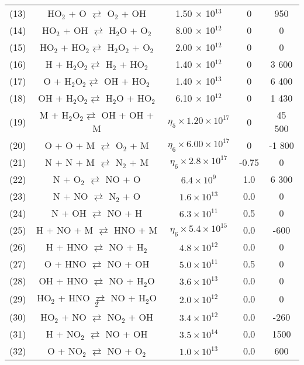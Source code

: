 \documentclass{warpdoc}
\begin{document}
\begin{table}[t]
\begin{center}
\begin{threeparttable}
\begin{tabular}{ccccc}
(13) & HO$_{2}$ + O $\rightleftarrows$ O$_{2}$ + OH & 1.50 $\times$ 10$^{13}$ & 0 &  950 \\
(14) & HO$_{2}$ + OH $\rightleftarrows$ H$_{2}$O + O$_{2}$ & 8.00 $\times$ 10$^{12}$ & 0 & 0 \\
(15) & HO$_{2}$ + HO$_{2} \rightleftarrows$ H$_{2}$O$_{2}$ + O$_{2}$ & 2.00 $\times$ 10$^{12}$ & 0 & 0 \\
(16) & H + H$_{2}$O$_{2} \rightleftarrows$ H$_{2}$ + HO$_{2}$ & 1.40 $\times$ 10$^{12}$ & 0 & 3 600 \\
(17) & O + H$_{2}$O$_{2} \rightleftarrows$ OH + HO$_{2}$ & 1.40 $\times$ 10$^{13}$ & 0 & 6 400 \\
(18) & OH + H$_{2}$O$_{2} \rightleftarrows$ H$_{2}$O + HO$_{2}$ & 6.10 $\times$ 10$^{12}$ & 0 & 1 430 \\
(19) & M + H$_{2}$O$_{2} \rightleftarrows$ OH + OH + M & $\eta_5 \times 1.20 \times 10^{17}$ & 0 & 45 500 \\
(20) & O + O + M $\rightleftarrows$ O$_{2}$ + M & $\eta_6 \times 6.00 \times 10^{17}$ & 0 & -1 800 \\
(21) & N + N + M $\rightleftarrows$ N$_{2}$ + M & $\eta_6 \times 2.8 \times 10^{17}$ & -0.75 & 0 \\
(22) & N + O$_2$  $\rightleftarrows$ NO + O & $6.4 \times 10^{9}$ & 1.0 & 6 300 \\
(23) & N + NO  $\rightleftarrows$ N$_2$ + O & $1.6 \times 10^{13}$ & 0.0 & 0 \\
(24) & N + OH  $\rightleftarrows$ NO + H & $6.3 \times 10^{11}$ & 0.5 & 0 \\
(25) & H + NO + M  $\rightleftarrows$ HNO + M & $\eta_6 \times 5.4 \times 10^{15}$ & 0.0 & -600 \\
(26) & H + HNO  $\rightleftarrows$ NO + H$_2$ & $4.8 \times 10^{12}$ & 0.0 & 0 \\
(27) & O + HNO  $\rightleftarrows$ NO + OH & $5.0 \times 10^{11}$ & 0.5 & 0 \\
(28) & OH + HNO  $\rightleftarrows$ NO + H$_2$O & $3.6 \times 10^{13}$ & 0.0 & 0 \\
(29) & HO$_2$ + HNO  $\rightleftarrows$ NO + H$_2$O$_2$ & $2.0 \times 10^{12}$ & 0.0 & 0 \\
(30) & HO$_2$ + NO  $\rightleftarrows$ NO$_2$ + OH & $3.4 \times 10^{12}$ & 0.0 & -260 \\
(31) & H + NO$_2$  $\rightleftarrows$ NO + OH & $3.5 \times 10^{14}$ & 0.0 & 1500 \\
(32) & O + NO$_2$  $\rightleftarrows$ NO + O$_2$ & $1.0 \times 10^{13}$ & 0.0 & 600 \\

\end{tabular}
\end{threeparttable}
\end{center}
\end{table}
\end{document}
